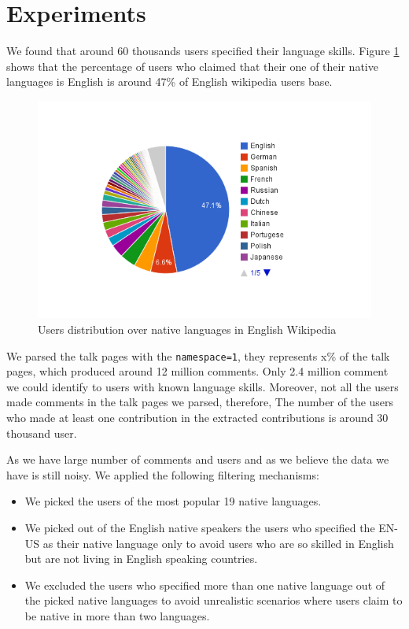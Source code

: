 \documentclass[11pt]{article}
\begin{document}
\section{Experiments}
We found that around 60 thousands users specified their language skills. Figure \ref{native_dist} shows that the percentage of users who claimed that their one of their native languages is English is around 47\% of English wikipedia users base. 
\begin{figure}[htp]
\centering
\includegraphics[scale=0.5]{chart_4.png}
\caption{Users distribution over native languages in English Wikipedia}
\label{native_dist}
\end{figure}

We parsed the talk pages with the \verb+namespace=1+, they represents x\% of the talk pages, which produced around 12 million comments. Only 2.4 million comment we could identify to users with known language skills. Moreover, not all the users made comments in the talk pages we parsed, therefore, The number of the users who made at least one contribution in the extracted contributions is around 30 thousand user.

As we have large number of comments and users and as we believe the data we have is still noisy. We applied the following filtering mechanisms:
\begin{itemize}
\item We picked the users of the most popular 19 native languages.
\item We picked out of the English native speakers the users who specified the EN-US as their native language only to avoid users who are so skilled in English but are not living in English speaking countries.
\item We excluded the users who specified more than one native language out of the picked native languages to avoid unrealistic scenarios where users claim to be native in more than two languages.
\end{itemize}
\end{document}
